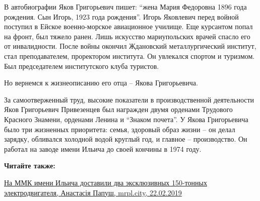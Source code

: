 В автобиографии Яков Григорьевич пишет: \enquote{жена Мария Федоровна 1896 года
рождения. Сын Игорь, 1923 года рождения}. Игорь Яковлевич перед войной поступил
в Ейское военно-морское авиационное училище. Еще курсантом попал на фронт, был
тяжело ранен. Лишь искусство мариупольских врачей спасло его от инвалидности.
После войны окончил Ждановский металлургический институт, стал преподавателем,
проректором института. Он увлекался спортом и туризмом. Был председателем
институтского клуба туристов.

Но вернемся к жизнеописанию его отца – Якова Григорьевича.

За самоотверженный труд, высокие показатели в производственной деятельности
Яков Григорьевич Привезенцев был награжден двумя орденами Трудового Красного
Знамени, орденами Ленина и \enquote{Знаком почета}. У Якова Григорьевича было три
жизненных приоритета: семья, здоровый образ жизни – он делал зарядку, обливался
холодной водой круглый год, и главное – производство. Он работал на заводе
имени Ильича до своей кончины в 1974 году.


\textbf{Читайте также:} 

\href{https://mrpl.city/news/view/na-mmk-imeni-ilicha-dostavili-dva-e-ksklyuzivnyh-150-tonnyh-e-lektrodvigatelya-foto}{%
На ММК имени Ильича доставили два эксклюзивных 150-тонных электродвигателя, Анастасія Папуш, mrpl.city, 22.02.2019}
